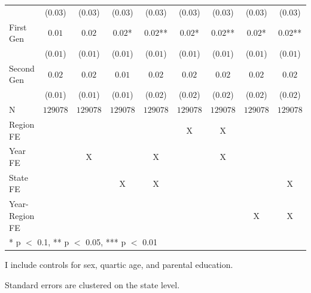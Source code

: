 \documentclass[12pt,english]{article}
\providecommand{\DIFaddtex}[1]{{\protect\color{blue}\uwave{#1}}} %
\providecommand{\DIFaddFL}[1]{\DIFadd{#1}} %
\providecommand{\DIFadd}[1]{\texorpdfstring{\DIFaddtex{#1}}{#1}} %
\begin{document}
\begin{table}[!h]
{\begin{threeparttable}
\begin{tabular}[t]{lcccccccc}
 & ($0.03$) & ($0.03$) & ($0.03$) & ($0.03$) & ($0.03$) & ($0.03$) & ($0.03$) & ($0.03$)\\
First Gen & $0.01$ & $0.02$ & $0.02$* & $0.02$** & $0.02$* & $0.02$** & $0.02$* & $0.02$**\\
 & ($0.01$) & ($0.01$) & ($0.01$) & ($0.01$) & ($0.01$) & ($0.01$) & ($0.01$) & ($0.01$)\\
Second Gen & $0.02$ & $0.02$ & $0.01$ & $0.02$ & $0.02$ & $0.02$ & $0.02$ & $0.02$\\
 & ($0.01$) & ($0.01$) & ($0.01$) & ($0.02$) & ($0.02$) & ($0.02$) & ($0.02$) & ($0.02$)\\
\midrule
N & $129078$ & $129078$ & $129078$ & $129078$ & $129078$ & $129078$ & $129078$ & $129078$\\
Region FE &  &  &  &  & X & X &  & \\
Year FE &  & X &  & X &  & X &  & \\
State FE &  &  & X & X &  &  &  & X\\
Year-Region FE &  &  &  &  &  &  & X & X\\
\bottomrule
\multicolumn{9}{l}{\rule{0pt}{1em}* p $<$ 0.1, ** p $<$ 0.05, *** p $<$ 0.01}\\
\end{tabular}
\begin{tablenotes}
\small
\item[\DIFaddFL{1}] \footnotesize{I include controls for sex, quartic age, and parental education.}
\item[\DIFaddFL{2}] \footnotesize{Standard errors are clustered on the state level.}
\end{tablenotes}
\end{threeparttable}}
\end{table}


\newpage
\pagebreak
\end{document}
